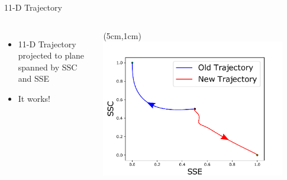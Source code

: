 \documentclass[15pt]{beamer}
\begin{document}
\begin{frame}{11-D Trajectory}
\begin{columns}
\begin{itemize}
	\item 11-D Trajectory projected to plane spanned by SSC and SSE 
	\item It works!
\end{itemize}

	\begin{textblock*}{9cm}(5cm,1cm) %
	 \includegraphics[width=0.9\textwidth]{11-D_traj}
	\end{textblock*}
\end{columns}
\end{frame}
\end{document}
